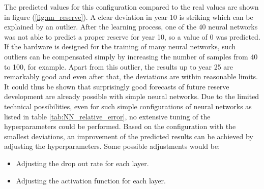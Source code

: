 The predicted values for this configuration compared to the real values are shown in figure (\ref{fig:nn_reserve}). A clear deviation in year 10 is striking which can be explained by an outlier. After the learning process, one of the 40 neural networks was not able to predict a proper reserve for year 10, so a value of 0 was predicted. If the hardware is designed for the training of many neural networks, such outliers can be compensated simply by increasing the number of samples from 40 to 100, for example. Apart from this outlier, the results up to year 25 are remarkably good and even after that, the deviations are within reasonable limits. It could thus be shown that surprisingly good forecasts of future reserve development are already possible with simple neural networks. Due to the limited technical possibilities, even for such simple configurations of neural networks as listed in table \ref{tab:NN_relative_error}, no extensive tuning of the hyperparameters could be performed. Based on the configuration with the smallest deviations, an improvement of the predicted results can be achieved by adjusting the hyperparameters. Some possible adjustments would be: 
\begin{itemize}
	\item Adjusting the drop out rate for each layer.
	\item Adjusting the activation function for each layer.
\end{itemize}


